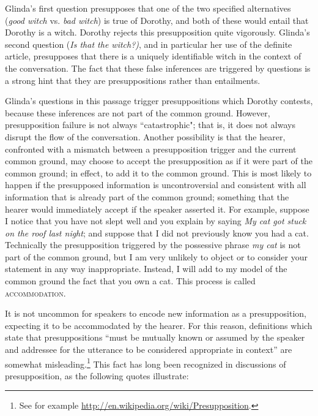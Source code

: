 Glinda’s first question presupposes that one of the two specified alternatives (\textit{good witch} vs. \textit{bad witch}) is true of Dorothy, and both of these would entail that Dorothy is a witch. Dorothy rejects this presupposition quite vigorously. Glinda’s second question (\textit{Is that the witch?)}, and in particular her use of the definite article, presupposes that there is a uniquely identifiable witch in the context of the conversation. The fact that these false inferences are triggered by questions is a strong hint that they are presuppositions rather than entailments.



Glinda’s questions in this passage trigger presuppositions which Dorothy contests, because these inferences are not part of the common ground. However, presupposition failure is not always ``catastrophic"; that is, it does not always disrupt the flow of the conversation. Another possibility is that the hearer, confronted with a mismatch between a presupposition trigger and the current common ground, may choose to accept the presupposition as if it were part of the common ground; in effect, to add it to the common ground. This is most likely to happen if the presupposed information is uncontroversial and consistent with all information that is already part of the common ground; something that the hearer would immediately accept if the speaker asserted it. For example, suppose I notice that you have not slept well and you explain by saying \textit{My cat got stuck on the roof last night}; and suppose that I did not previously know you had a cat. Technically the presupposition triggered by the possessive phrase \textit{my cat} is not part of the common ground, but I am very unlikely to object or to consider your statement in any way inappropriate. Instead, I will add to my model of the common ground the fact that you own a cat. This process is called \textsc{accommodation}.



It is not uncommon for speakers to encode new information as a presupposition, expecting it to be accommodated by the hearer. For this reason, definitions which state that presuppositions “must be mutually known or assumed by the speaker and addressee for the utterance to be considered appropriate in context” are somewhat misleading.\footnote{See for example \url{http://en.wikipedia.org/wiki/Presupposition}.} This fact has long been recognized in discussions of presupposition, as the following quotes illustrate:


